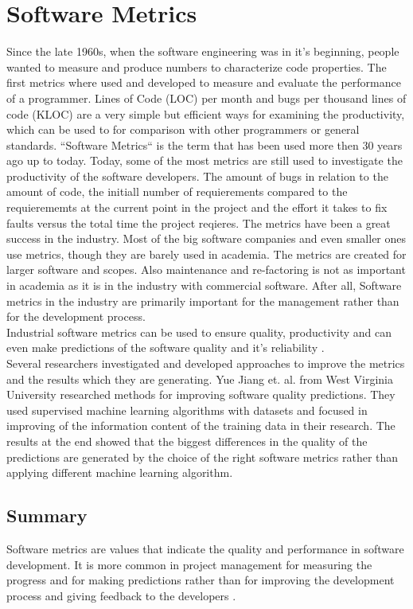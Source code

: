 \section{Software Metrics}
Since the late 1960s, when the software engineering was in it's beginning, people wanted to measure and produce numbers to characterize code properties. 
The first metrics where used and developed to measure and evaluate the performance of a programmer. Lines of Code (LOC) per month and bugs per thousand lines of code (KLOC) are a very simple but efficient ways for examining the productivity, which can be used to for comparison with other programmers or general standards.
\bigbreak
``Software Metrics`` is the term that has been used more then 30 years ago up to today.
Today, some of the most metrics are still used to investigate the productivity of the software developers. The amount of bugs in relation to the amount of code, the initiall number of requierements compared to the requierememts at the current point in the project and the effort it takes to fix faults versus the total time the project reqieres. \cite{kaner2004software}
The metrics have been a great success in the industry. Most of the big software companies and even smaller ones use metrics, though they are barely used in academia. 
The metrics are created for larger software and scopes. Also maintenance and re-factoring is not as important in academia as it is in the industry with commercial software. After all, Software metrics in the industry are primarily important for the management rather than for the development process.\\
Industrial software metrics can be used to ensure quality, productivity and can even make predictions of the software quality and it's reliability \cite{fenton1999software}.\\
Several researchers investigated and developed approaches to improve the metrics and the results which they are generating. 
Yue Jiang et. al. \cite{jiang2008comparing} from West Virginia University researched methods for improving software quality predictions. They used supervised machine learning algorithms with datasets and focused in improving of the information content of the training data in their research. The results at the end showed that the biggest differences in the quality of the predictions are generated by the choice of the right software metrics rather than applying different machine learning algorithm. 

\subsection{Summary}
Software metrics are values that indicate the quality and performance in software development. It is more common in project management for measuring the progress and for making predictions rather than for improving the development process and giving feedback to the developers . 


